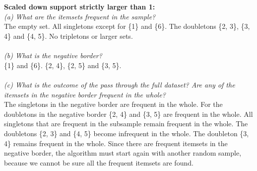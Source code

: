 \documentclass{article}
\begin{document}
\\
\\
\textbf{Scaled down support strictly larger than 1:}
\\
\textit{(a) What are the itemsets frequent in the sample?}
\\
The empty set. All singletons except for \{1\} and \{6\}.
The doubletons \{2, 3\}, \{3, 4\} and \{4, 5\}. No tripletons or larger sets.
\\
\\
\textit{(b) What is the negative border?}
\\
\{1\} and \{6\}. \{2, 4\}, \{2, 5\} and \{3, 5\}.
\\
\\
\textit{(c) What is the outcome of the pass through the full dataset? Are any of the
itemsets in the negative border frequent in the whole?}
\\
The singletons in the negative border are frequent in the whole. For the doubletons in the negative border \{2, 4\} and \{3, 5\} are frequent in the whole. All singletons that are frequent in the subsample remain frequent in the whole. The doubletons \{2, 3\} and \{4, 5\} become infrequent in the whole. The doubleton \{3, 4\} remains frequent in the whole. Since there are frequent itemsets in the negative border, the algorithm must start again with another random sample, because we cannot be sure all the frequent itemsets are found.
\end{document}
